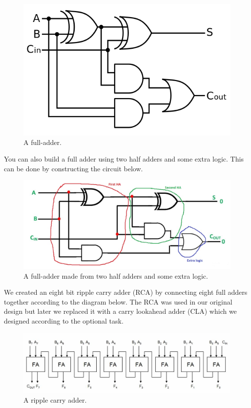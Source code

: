 \documentclass[a4paper,11pt]{article}
\begin{document}
\begin{figure}[h!]
  \includegraphics[width=\linewidth]{fulladder.png}
  \caption{A full-adder.}
  \label{fig:etikett}
\end{figure}

You can also build a full adder using two half adders and some extra logic. This can be done by constructing the circuit below.

\begin{figure}[h!]
  \includegraphics[width=\linewidth]{fulladderfromhalfadder.jpg}
  \caption{A full-adder made from two half adders and some extra logic.}
  \label{fig:etikett}
\end{figure}

We created an eight bit ripple carry adder (RCA) by connecting eight full adders together according to the diagram below. The RCA was used in our original design but later we replaced it with a carry lookahead adder (CLA) which we designed according to the optional task. 

\begin{figure}[h!]
  \includegraphics[width=\linewidth]{rca.jpg}
  \caption{A ripple carry adder.}
  \label{fig:etikett}
\end{figure}
\end{document}
